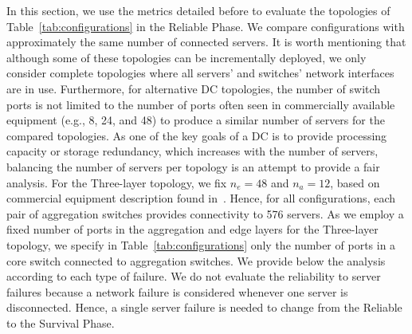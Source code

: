 In this section, we use the metrics detailed before to evaluate the topologies of Table~\ref{tab:configurations} in the Reliable Phase. We compare configurations with approximately the same number of connected servers. It is worth mentioning that although some of these topologies can be incrementally deployed, we only consider complete topologies where all servers' and switches' network interfaces are in use. Furthermore, for alternative DC topologies, the number of switch ports is not limited to the number of ports often seen in commercially available equipment (e.g., 8, 24, and 48) to produce a similar number of servers for the compared topologies. As one of the key goals of a DC is to provide processing capacity or storage redundancy, which increases with the number of servers, balancing the number of servers per topology is an attempt to provide a fair analysis. 
For the Three-layer topology, we fix $n_e=48$ and $n_a=12$, based on commercial equipment description found in~\cite{scotland}. Hence, for all configurations, each pair of aggregation switches provides connectivity to 576 servers.
As we employ a fixed number of ports in the aggregation and edge layers for the Three-layer topology, we specify in Table~\ref{tab:configurations} only the number of ports in a core switch connected to aggregation switches. 
We provide below the analysis according to each type of failure. We do not evaluate the reliability to server failures because a network failure is considered whenever one server is disconnected. Hence, a single server failure is needed to change from the Reliable to the Survival Phase.
